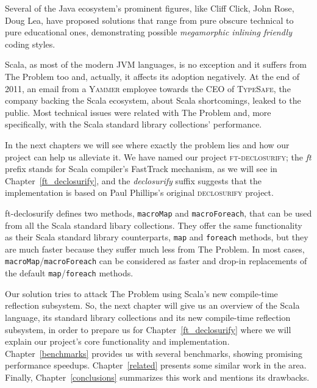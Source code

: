 Several of the Java ecosystem's prominent figures, like Cliff Click, John Rose,
Doug Lea, have proposed solutions that range from pure obscure technical to pure
educational ones, demonstrating possible \emph{megamorphic inlining friendly}
coding styles.

Scala, as most of the modern JVM languages, is no exception and it suffers from
The Problem too and, actually, it affects its adoption negatively. At the end of
2011, an email from a \textsc{Yammer} employee towards the CEO of \textsc{TypeSafe}, the company
backing the Scala ecosystem, about Scala shortcomings, leaked to the public. Most technical issues were
related with The Problem and, more specifically, with the Scala standard
library collections' performance. 

In the next chapters we will see where exactly the problem lies and how
our project can help us alleviate it. We have named our project
\textsc{ft-declosurify}; the \emph{ft} prefix stands for Scala compiler's FastTrack
mechanism, as we will see in Chapter~\ref{ft_declosurify}, and the \emph{declosurify} suffix suggests that
the implementation is based on Paul Phillips's original \textsc{declosurify} project. 

ft-declosurify defines two methods, \texttt{macroMap} and \texttt{macroForeach}, that can be used
from all the Scala standard libary collections. They offer the same
functionality as their Scala standard library counterparts, \texttt{map} and \texttt{foreach}
methods, but they are much faster because they suffer much less from The
Problem. In most cases, \texttt{macroMap}/\texttt{macroForeach} can be considered as faster and
drop-in replacements of the default \texttt{map}/\texttt{foreach} methods.

Our solution tries to attack The Problem using Scala's new compile-time
reflection subsystem. So, the next chapter will give us an overview of the Scala language, its standard library collections and its new
compile-time reflection subsystem, in order to prepare us for Chapter~\ref{ft_declosurify}
where we will explain our project's core functionality and implementation.
Chapter~\ref{benchmarks} provides us with several benchmarks, showing promising performance
speedups. Chapter~\ref{related} presents some similar work in the area. Finally, Chapter~\ref{conclusions}
summarizes this work and mentions its drawbacks.